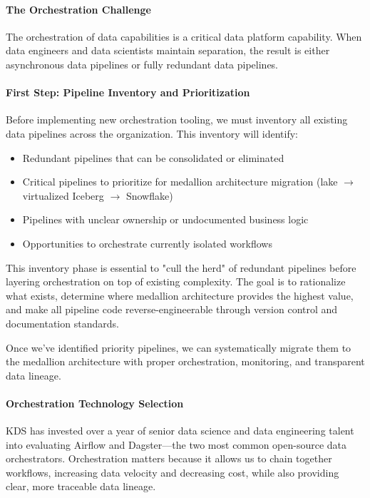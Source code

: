 \documentclass[12pt, a4paper]{article}
\begin{document}
\paragraph{The Orchestration Challenge}
The orchestration of data capabilities is a critical data platform capability. When data engineers and data scientists maintain separation, the result is either asynchronous data pipelines or fully redundant data pipelines.

\paragraph{First Step: Pipeline Inventory and Prioritization}
Before implementing new orchestration tooling, we must inventory all existing data pipelines across the organization. This inventory will identify:

\begin{itemize}[leftmargin=*, nosep]
    \item Redundant pipelines that can be consolidated or eliminated
    \item Critical pipelines to prioritize for medallion architecture migration (lake $\rightarrow$ virtualized Iceberg $\rightarrow$ Snowflake)
    \item Pipelines with unclear ownership or undocumented business logic
    \item Opportunities to orchestrate currently isolated workflows
\end{itemize}

This inventory phase is essential to "cull the herd" of redundant pipelines before layering orchestration on top of existing complexity. The goal is to rationalize what exists, determine where medallion architecture provides the highest value, and make all pipeline code reverse-engineerable through version control and documentation standards.

Once we've identified priority pipelines, we can systematically migrate them to the medallion architecture with proper orchestration, monitoring, and transparent data lineage.

\paragraph{Orchestration Technology Selection}
KDS has invested over a year of senior data science and data engineering talent into evaluating Airflow and Dagster—the two most common open-source data orchestrators. Orchestration matters because it allows us to chain together workflows, increasing data velocity and decreasing cost, while also providing clear, more traceable data lineage.
\end{document}
